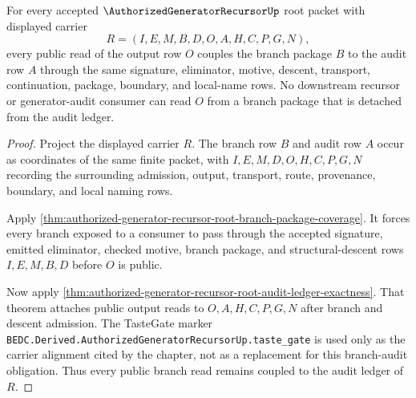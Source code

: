 \begin{theorem}
\label{thm:authorized-generator-recursor-root-branch-audit-coupling}
For every accepted $\AuthorizedGeneratorRecursorUp$ root packet with displayed carrier
$$
R=(I,E,M,B,D,O,A,H,C,P,G,N),
$$
every public read of the output row $O$ couples the branch package $B$ to the audit row $A$ through the same signature, eliminator, motive, descent, transport, continuation, package, boundary, and local-name rows. No downstream recursor or generator-audit consumer can read $O$ from a branch package that is detached from the audit ledger.
\end{theorem}
\begin{proof}
Project the displayed carrier $R$. The branch row $B$ and audit row $A$ occur as coordinates of the same finite packet, with $I,E,M,D,O,H,C,P,G,N$ recording the surrounding admission, output, transport, route, provenance, boundary, and local naming rows.

Apply \autoref{thm:authorized-generator-recursor-root-branch-package-coverage}. It forces every branch exposed to a consumer to pass through the accepted signature, emitted eliminator, checked motive, branch package, and structural-descent rows $I,E,M,B,D$ before $O$ is public.

Now apply \autoref{thm:authorized-generator-recursor-root-audit-ledger-exactness}. That theorem attaches public output reads to $O,A,H,C,P,G,N$ after branch and descent admission. The TasteGate marker \texttt{BEDC.Derived.AuthorizedGeneratorRecursorUp.taste\_gate} is used only as the carrier alignment cited by the chapter, not as a replacement for this branch-audit obligation. Thus every public branch read remains coupled to the audit ledger of $R$.
\end{proof}

